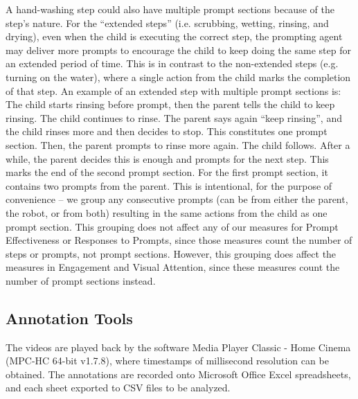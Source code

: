 \documentclass{ut-thesis}
\begin{document}
A hand-washing step could also have multiple prompt sections because of the step's nature.  For the ``extended steps'' (i.e. scrubbing, wetting, rinsing, and drying), even when the child is executing the correct step, the prompting agent may deliver more prompts to encourage the child to keep doing the same step for an extended period of time.  This is in contrast to the non-extended steps (e.g. turning on the water), where a single action from the child marks the completion of that step.  An example of an extended step with multiple prompt sections is: The child starts rinsing before prompt, then the parent tells the child to keep rinsing.  The child continues to rinse.  The parent says again ``keep rinsing'', and the child rinses more and then decides to stop.  This constitutes one prompt section.  Then, the parent prompts to rinse more again.  The child follows.  After a while, the parent decides this is enough and prompts for the next step.  This marks the end of the second prompt section.  For the first prompt section, it contains two prompts from the parent.  This is intentional, for the purpose of convenience -- we group any consecutive prompts (can be from either the parent, the robot, or from both) resulting in the same actions from the child as one prompt section.  This grouping does not affect any of our measures for Prompt Effectiveness or Responses to Prompts, since those measures count the number of steps or prompts, not prompt sections.  However, this grouping does affect the measures in Engagement and Visual Attention, since these measures count the number of prompt sections instead.


\subsection{Annotation Tools}
The videos are played back by the software Media Player Classic - Home Cinema (MPC-HC 64-bit v1.7.8), where timestamps of millisecond resolution can be obtained.  The annotations are recorded onto Microsoft Office Excel spreadsheets, and each sheet exported to CSV files to be analyzed.
\end{document}
